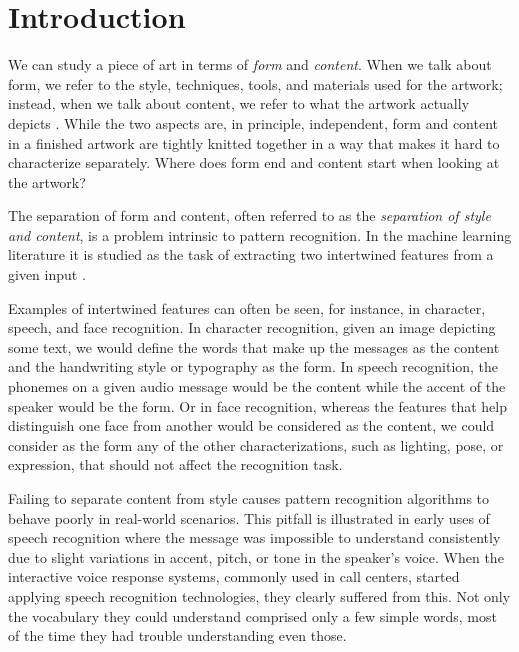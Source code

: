 
\chapter{Introduction}
\label{chap:intro}




We can study a piece of art in terms of \emph{form} and \emph{content}.
When we talk about form, we refer to the style, techniques, tools, and materials used for the artwork; instead, when we talk about content, we refer to what the artwork actually depicts \cite{Esaak}.
While the two aspects are, in principle, independent, form and content in a finished artwork are tightly knitted together in a way that makes it hard to characterize separately.
Where does form end and content start when looking at the artwork? \cite{Xie2007}

The separation of form and content, often referred to as the \emph{separation of style and content}, is a problem intrinsic to pattern recognition.
In the machine learning literature it is studied as the task of extracting two intertwined features from a given input \cite{Tenenbaum1997,Tenenbaum2000}.

Examples of intertwined features can often be seen, for instance, in character, speech, and face recognition.
In character recognition, given an image depicting some text, we would define the words that make up the messages as the content and the handwriting style or typography as the form.
In speech recognition, the phonemes on a given audio message would be the content while the accent of the speaker would be the form.
Or in face recognition, whereas the features that help distinguish one face from another would be considered as the content, we could consider as the form any of the other characterizations, such as lighting, pose, or expression, that should not affect the recognition task.

Failing to separate content from style causes pattern recognition algorithms to behave poorly in real-world scenarios.
This pitfall is illustrated in early uses of speech recognition where the message was impossible to understand consistently due to slight variations in accent, pitch, or tone in the speaker's voice.
When the interactive voice response systems, commonly used in call centers, started applying speech recognition technologies, they clearly suffered from this.
Not only the vocabulary they could understand comprised only a few simple words, most of the time they had trouble understanding even those.

